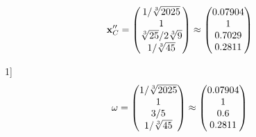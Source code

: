 \documentclass[10pt,a4paper]{article}
\begin{document}
	\[
		\bold{x}''_{C} = 
		\begin{pmatrix}
			{1} / {\sqrt[3]{2025}} \\
			{1}{} \\
			{\sqrt[3]{25}} / {{2}\sqrt[3]{9}} \\
			{1} / {\sqrt[3]{45}} \\
		\end{pmatrix}
		\approx
		\begin{pmatrix}
			0.07904  \\
			1        \\
			0.7029   \\
			0.2811   \\
		\end{pmatrix}
	\]

	1]
	\[
		\bold{\omega} = 
		\begin{pmatrix}
			{1} / {\sqrt[3]{2025}} \\
			{1}{} \\
			{{3}} / {{5}} \\
			{1} / {\sqrt[3]{45}} \\
		\end{pmatrix}
		\approx
		\begin{pmatrix}
			0.07904  \\
			1        \\
			0.6      \\
			0.2811   \\
		\end{pmatrix}
	\]
\end{document}

